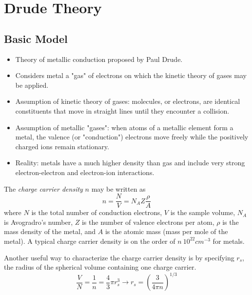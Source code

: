 \documentclass[10pt]{article}
\begin{document}
\maketitle

\section{Drude Theory}
\subsection{Basic Model}
\begin{itemize}
  \item Theory of metallic conduction proposed by Paul Drude.
  \item Considers metal a "gas" of electrons on which the kinetic theory of gases may be applied.
  \item Assumption of kinetic theory of gases: molecules, or electrons, are identical constituents that move
  in straight lines until they encounter a collision.
  \item Assumption of metallic "gases": when atoms of a metallic element form a metal, the valence (or "conduction")
  electrons move freely while the positively charged ions remain stationary.
  \item Reality: metals have a much higher density than gas and include very strong electron-electron and electron-ion
  interactions.

\end{itemize}

The \emph{charge carrier density} $n$ may be written as
$$
n = \frac{N}{V} = N_{A}Z\frac{\rho}{A}
$$
where $N$ is the total number of conduction electrons, $V$ is the sample volume, $N_{A}$ is Avogradro's number,
$Z$ is the number of valence electrons per atom, $\rho$ is the mass density of the metal, and $A$ is the atomic mass (mass per mole of
the metal). A typical charge carrier density is on the order of $n ~ 10^{22} cm^{-3}$ for metals.

Another useful way to characterize the charge carrier density is by specifying $r_{s}$, the radius of the spherical volume containing
one charge carrier.
$$
\frac{V}{N} = \frac{1}{n} = \frac{4}{3}\pi r_{s}^{3} \rightarrow r_{s} = \left (\frac{3}{4\pi n}\right )^{1/3}
$$
\end{document}
